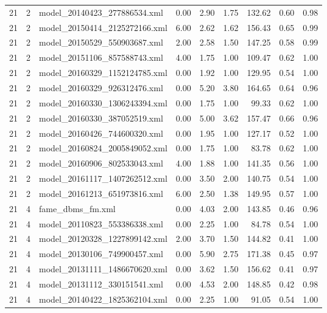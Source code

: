 \begin{table}[ht]
\begin{tabular}{rrlrrrrrr}
   21 &   2 & model\_20140423\_277886534.xml & 0.00 & 2.90 & 1.75 & 132.62 & 0.60 & 0.98 \\ 
   21 &   2 & model\_20150414\_2125272166.xml & 6.00 & 2.62 & 1.62 & 156.43 & 0.65 & 0.99 \\ 
   21 &   2 & model\_20150529\_550903687.xml & 2.00 & 2.58 & 1.50 & 147.25 & 0.58 & 0.99 \\ 
   21 &   2 & model\_20151106\_857588743.xml & 4.00 & 1.75 & 1.00 & 109.47 & 0.62 & 1.00 \\ 
   21 &   2 & model\_20160329\_1152124785.xml & 0.00 & 1.92 & 1.00 & 129.95 & 0.54 & 1.00 \\ 
   21 &   2 & model\_20160329\_926312476.xml & 0.00 & 5.20 & 3.80 & 164.65 & 0.64 & 0.96 \\ 
   21 &   2 & model\_20160330\_1306243394.xml & 0.00 & 1.75 & 1.00 & 99.33 & 0.62 & 1.00 \\ 
   21 &   2 & model\_20160330\_387052519.xml & 0.00 & 5.00 & 3.62 & 157.47 & 0.66 & 0.96 \\ 
   21 &   2 & model\_20160426\_744600320.xml & 0.00 & 1.95 & 1.00 & 127.17 & 0.52 & 1.00 \\ 
   21 &   2 & model\_20160824\_2005849052.xml & 0.00 & 1.75 & 1.00 & 83.78 & 0.62 & 1.00 \\ 
   21 &   2 & model\_20160906\_802533043.xml & 4.00 & 1.88 & 1.00 & 141.35 & 0.56 & 1.00 \\ 
   21 &   2 & model\_20161117\_1407262512.xml & 0.00 & 3.50 & 2.00 & 140.75 & 0.54 & 1.00 \\ 
   21 &   2 & model\_20161213\_651973816.xml & 6.00 & 2.50 & 1.38 & 149.95 & 0.57 & 1.00 \\ 
   21 &   4 & fame\_dbms\_fm.xml & 0.00 & 4.03 & 2.00 & 143.85 & 0.46 & 0.96 \\ 
   21 &   4 & model\_20110823\_553386338.xml & 0.00 & 2.25 & 1.00 & 84.78 & 0.54 & 1.00 \\ 
   21 &   4 & model\_20120328\_1227899142.xml & 2.00 & 3.70 & 1.50 & 144.82 & 0.41 & 1.00 \\ 
   21 &   4 & model\_20130106\_749900457.xml & 0.00 & 5.90 & 2.75 & 171.38 & 0.45 & 0.97 \\ 
   21 &   4 & model\_20131111\_1486670620.xml & 0.00 & 3.62 & 1.50 & 156.62 & 0.41 & 0.97 \\ 
   21 &   4 & model\_20131112\_330151541.xml & 0.00 & 4.53 & 2.00 & 148.85 & 0.42 & 0.98 \\ 
   21 &   4 & model\_20140422\_1825362104.xml & 0.00 & 2.25 & 1.00 & 91.05 & 0.54 & 1.00 \\ 

\end{tabular}
\end{table}
